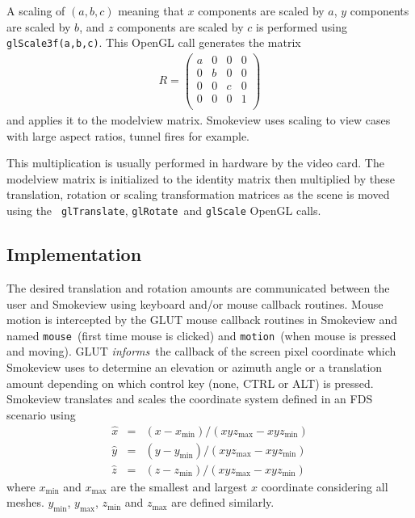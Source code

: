 \documentclass[11pt,twoside]{book}
\begin{document}
A scaling of $(a,b,c)$ meaning that $x$ components are scaled by
$a$, $y$ components are scaled by $b$, and $z$ components are
scaled by $c$ is performed using {\tt glScale3f(a,b,c)}. This
OpenGL call generates the matrix
\begin{eqnarray}
R=\left(%
\begin{array}{cccc}
  a & 0 & 0 & 0 \\
  0 & b & 0 & 0 \\
  0 & 0 & c & 0 \\
  0 & 0 & 0 & 1 \\
\end{array}%
\right)
\end{eqnarray}
and applies it to the modelview matrix. Smokeview uses scaling to
view cases with large aspect ratios, tunnel fires for example.

This multiplication is usually performed in hardware by the video
card.  The modelview matrix is initialized to the identity matrix
then multiplied by these translation, rotation or scaling
transformation matrices as the scene is moved using the {\tt
glTranslate}, {\tt glRotate}\ and {\tt glScale} OpenGL calls.


\subsection{Implementation}
The desired translation and rotation amounts are communicated
between the user and Smokeview using keyboard and/or mouse
callback routines.  Mouse motion is intercepted by the GLUT mouse
callback routines in Smokeview and named {\tt mouse}\ (first time
mouse is clicked) and {\tt motion}\ (when mouse is pressed and
moving).  GLUT {\em informs}\ the callback of the screen pixel
coordinate which Smokeview uses to determine an elevation or
azimuth angle or a translation amount depending on which control
key (none, CTRL or ALT) is pressed. Smokeview translates and
scales the coordinate system defined in an FDS scenario using
\newcommand{\mmin}{\mbox{min}}
\newcommand{\mmax}{\mbox{max}}
\begin{eqnarray}
\hat{x}&=&(x-x_{\min})/(xyz_{\max}-xyz_{\min})\\
\hat{y}&=&(y-y_{\min})/(xyz_{\max}-xyz_{\min})\\
\hat{z}&=&(z-z_{\min})/(xyz_{\max}-xyz_{\min})
\end{eqnarray}
where $x_{\min}$ and $x_{\max}$ are the smallest and largest $x$
coordinate considering all meshes.  $y_{\min}$, $y_{\max}$,
$z_{\min}$ and $z_{\max}$ are defined similarly.
\end{document}
